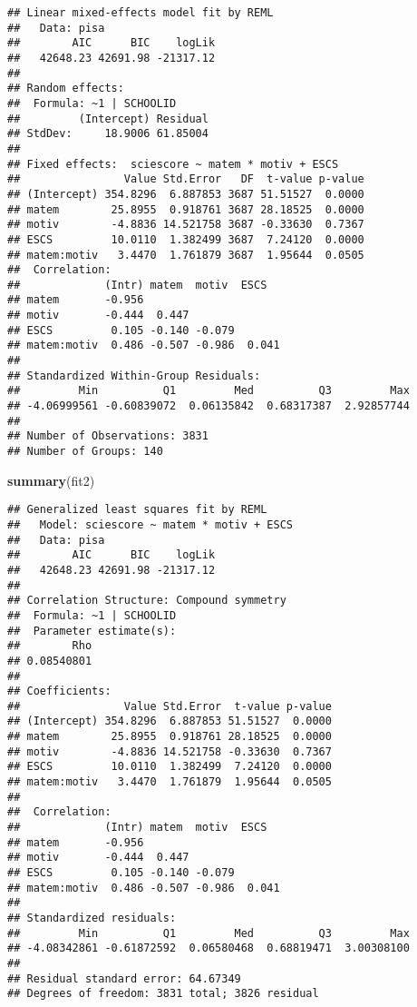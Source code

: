\documentclass[
]{article}
\newenvironment{Shaded}{\begin{snugshade}}{\end{snugshade}}
\newcommand{\FunctionTok}[1]{\textcolor[rgb]{0.13,0.29,0.53}{\textbf{#1}}}
\newcommand{\NormalTok}[1]{#1}
\begin{document}
\begin{verbatim}
## Linear mixed-effects model fit by REML
##   Data: pisa 
##        AIC      BIC    logLik
##   42648.23 42691.98 -21317.12
## 
## Random effects:
##  Formula: ~1 | SCHOOLID
##         (Intercept) Residual
## StdDev:     18.9006 61.85004
## 
## Fixed effects:  sciescore ~ matem * motiv + ESCS 
##                Value Std.Error   DF  t-value p-value
## (Intercept) 354.8296  6.887853 3687 51.51527  0.0000
## matem        25.8955  0.918761 3687 28.18525  0.0000
## motiv        -4.8836 14.521758 3687 -0.33630  0.7367
## ESCS         10.0110  1.382499 3687  7.24120  0.0000
## matem:motiv   3.4470  1.761879 3687  1.95644  0.0505
##  Correlation: 
##             (Intr) matem  motiv  ESCS  
## matem       -0.956                     
## motiv       -0.444  0.447              
## ESCS         0.105 -0.140 -0.079       
## matem:motiv  0.486 -0.507 -0.986  0.041
## 
## Standardized Within-Group Residuals:
##         Min          Q1         Med          Q3         Max 
## -4.06999561 -0.60839072  0.06135842  0.68317387  2.92857744 
## 
## Number of Observations: 3831
## Number of Groups: 140
\end{verbatim}

\begin{Shaded}
\begin{Highlighting}[]
\FunctionTok{summary}\NormalTok{(fit2)}
\end{Highlighting}
\end{Shaded}

\begin{verbatim}
## Generalized least squares fit by REML
##   Model: sciescore ~ matem * motiv + ESCS 
##   Data: pisa 
##        AIC      BIC    logLik
##   42648.23 42691.98 -21317.12
## 
## Correlation Structure: Compound symmetry
##  Formula: ~1 | SCHOOLID 
##  Parameter estimate(s):
##        Rho 
## 0.08540801 
## 
## Coefficients:
##                Value Std.Error  t-value p-value
## (Intercept) 354.8296  6.887853 51.51527  0.0000
## matem        25.8955  0.918761 28.18525  0.0000
## motiv        -4.8836 14.521758 -0.33630  0.7367
## ESCS         10.0110  1.382499  7.24120  0.0000
## matem:motiv   3.4470  1.761879  1.95644  0.0505
## 
##  Correlation: 
##             (Intr) matem  motiv  ESCS  
## matem       -0.956                     
## motiv       -0.444  0.447              
## ESCS         0.105 -0.140 -0.079       
## matem:motiv  0.486 -0.507 -0.986  0.041
## 
## Standardized residuals:
##         Min          Q1         Med          Q3         Max 
## -4.08342861 -0.61872592  0.06580468  0.68819471  3.00308100 
## 
## Residual standard error: 64.67349 
## Degrees of freedom: 3831 total; 3826 residual
\end{verbatim}
\end{document}
